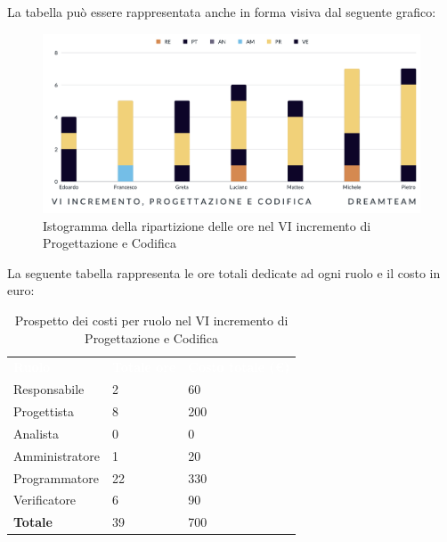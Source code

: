 La tabella può essere rappresentata anche in forma visiva dal seguente grafico:
\begin{figure}[H]
\centering
\includegraphics[scale=0.50]{Sezioni/SezioniPreventivo/grafici/progettazione/Progettazione_VI_incremento.png}
\caption{Istogramma della ripartizione delle ore nel VI incremento di Progettazione e Codifica}
\end{figure}

La seguente tabella rappresenta le ore totali dedicate ad ogni ruolo e il costo in euro:

\begin{table}[H]
\begin{center}
\renewcommand{\arraystretch}{1.5}
\begin{tabular}{ m{}<{\centering}  m{}<{\centering} m{}<{\centering}}
	\rowcolor{darkblue}
	\textcolor{white}{\textbf{Ruolo}}&\textcolor{white}{\textbf{Totale ore}}&\textcolor{white}{\textbf{Costo totale (\euro)}}\\ 

	Responsabile  & 2 & 60 \\	
	
	Progettista & 8 & 200 \\
	
	Analista & 0 & 0 \\

	Amministratore & 1 & 20 \\
	
	Programmatore & 22 & 330 \\
	
	Verificatore & 6 & 90 \\
	
	\textbf{Totale} & 39 & 700 \\
	
\end{tabular}
\caption{Prospetto dei costi per ruolo nel VI incremento di Progettazione e Codifica}
\end{center}
\end{table}

